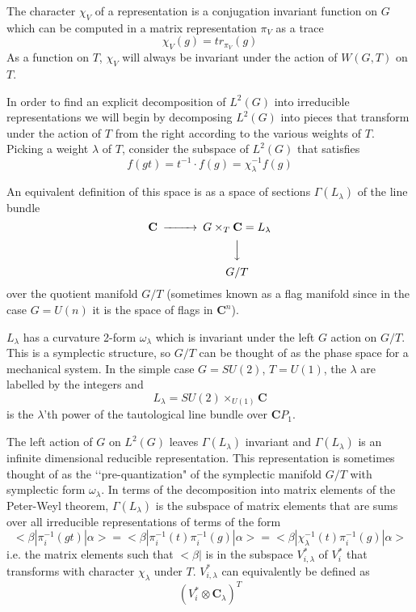 \documentclass[a4paper,a4paper]{article}
\theoremstyle{conjecture}
\begin{document}
The character $\chi_V$ of a representation is a conjugation
invariant function on $G$ which can be computed in a matrix
representation $\pi_V$ as a trace
$$\chi_V(g) = tr_{\pi_V}(g)$$
As a function on $T$, $\chi_V$ will always be invariant under the action of $W(G,T)$ on $T$.

In order to find an explicit decomposition of $L^2(G)$ into irreducible representations
we will begin by decomposing
$L^2(G)$ into pieces that transform under the action of $T$ from the right according to the various
weights of $T$. Picking a weight $\lambda$ of $T$, consider the subspace of
$L^2(G)$ that satisfies
$$f(gt)=t^{-1}\cdot f(g)=\chi_\lambda^{-1}f(g)$$

An equivalent definition of this
space is as a space of sections $\Gamma(L_\lambda)$ of the line bundle
\begin {equation*}
\begin{CD}
{\mathbf C} @>>>G\times_T{\mathbf C}=L_\lambda \\
@. @VVV\\
{} @. G/T
\end{CD}
\end{equation*}
over the quotient manifold $G/T$ (sometimes known as a flag
manifold since in the case $G=U(n)$ it is the space of flags in
$\mathbf C^n$).

$L_\lambda$ has a curvature 2-form $\omega_\lambda$ which is
invariant under the left $G$ action on $G/T$.  This is a
symplectic structure, so $G/T$ can be thought of as the phase
space for a mechanical system.  In the simple case $G=SU(2)$,
$T=U(1)$, the $\lambda$ are labelled by the integers and
$$L_{\lambda}=SU(2)\times_{U(1)}{\mathbf C}$$ is
the $\lambda$'th power of the tautological line bundle over ${\mathbf CP_1}$.

The left action of $G$ on $L^2(G)$ leaves $\Gamma(L_\lambda)$
invariant and $\Gamma(L_\lambda)$ is an infinite dimensional
reducible representation.  This representation is sometimes
thought of as the \lq\lq pre-quantization" of the symplectic manifold
$G/T$ with symplectic form $\omega_\lambda$.
In terms of the decomposition into
matrix elements of the Peter-Weyl theorem, $\Gamma(L_\lambda)$ is
the subspace of matrix elements that are sums over all irreducible
representations of terms of the form
$$<\beta |\pi_i^{-1}(gt) |\alpha>=<\beta |\pi_i^{-1}(t)\pi_i^{-1}(g) |\alpha>=
<\beta |\chi_\lambda^{-1}(t)\pi_i^{-1}(g) |\alpha>$$
i.e. the matrix elements such that $<\beta|$ is in the subspace
$V_{i,\lambda}^*$ of $V_i^*$ that transforms with character
$\chi_\lambda$ under $T$. $V_{i,\lambda}^*$ can equivalently be defined as
$$(V_i^*\otimes \mathbf C_\lambda)^T$$
\end{document}
